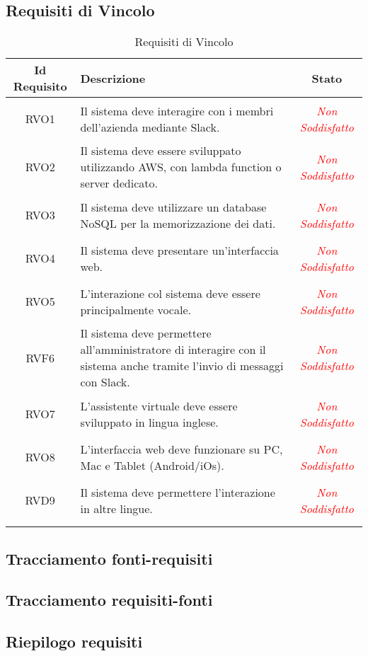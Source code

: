 \subsection{Requisiti di Vincolo}
\normalsize
\begin{longtable}{|c|>{\centering}m{7cm}|c|}
\hline 
\textbf{Id Requisito} & \textbf{Descrizione} & \textbf{Stato}\\
\hline
\endhead
\hypertarget{RVO1}{RVO1} & Il sistema deve interagire con i membri dell'azienda mediante Slack. & \textcolor{Red}{\textit{Non Soddisfatto}}\\ \hline

\hypertarget{RVO2}{RVO2} & Il sistema deve essere sviluppato utilizzando AWS, con lambda function o server dedicato. & \textcolor{Red}{\textit{Non Soddisfatto}}\\ \hline

\hypertarget{RVO3}{RVO3} & Il sistema deve utilizzare un database NoSQL per la memorizzazione dei dati. & \textcolor{Red}{\textit{Non Soddisfatto}}\\ \hline

\hypertarget{RVO4}{RVO4} & Il sistema deve presentare un'interfaccia web. & \textcolor{Red}{\textit{Non Soddisfatto}}\\ \hline

\hypertarget{RVO5}{RVO5} & L'interazione col sistema deve essere principalmente vocale. & \textcolor{Red}{\textit{Non Soddisfatto}}\\ \hline

\hypertarget{RVF6}{RVF6} & Il sistema deve permettere all'amministratore di interagire con il sistema anche tramite l'invio di messaggi con Slack. & \textcolor{Red}{\textit{Non Soddisfatto}}\\ \hline

\hypertarget{RVO7}{RVO7} & L'assistente virtuale deve essere sviluppato in lingua inglese. & \textcolor{Red}{\textit{Non Soddisfatto}}\\ \hline

\hypertarget{RVO8}{RVO8} & L'interfaccia web deve funzionare su PC, Mac e Tablet (Android/iOs). & \textcolor{Red}{\textit{Non Soddisfatto}}\\ \hline

\hypertarget{RVD9}{RVD9} & Il sistema deve permettere l'interazione in altre lingue. & \textcolor{Red}{\textit{Non Soddisfatto}}\\ \hline

\caption[Requisiti di Vincolo]{Requisiti di Vincolo}
\label{tabella:req3}
\end{longtable}
\clearpage

\subsection{Tracciamento fonti-requisiti}
\subsection{Tracciamento requisiti-fonti}
\subsection{Riepilogo requisiti}